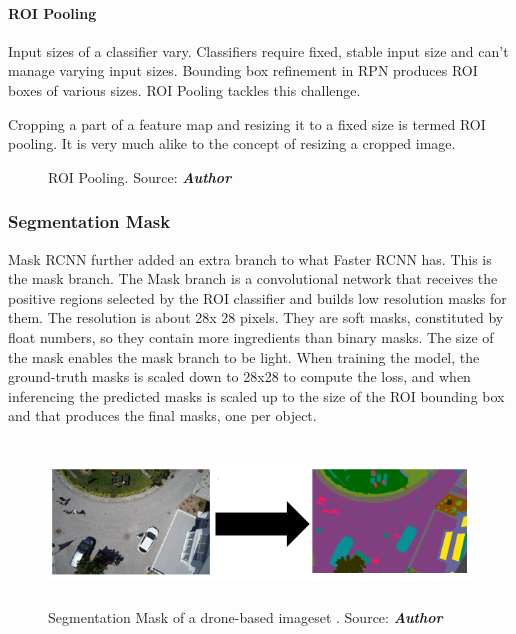 {\paragraph{ROI Pooling}

Input sizes of a classifier vary. Classifiers require fixed, stable input size and can’t manage varying input sizes. 
Bounding box refinement in RPN produces ROI boxes of various sizes. ROI Pooling tackles this challenge.

Cropping a part of a feature map and resizing it to a fixed size is termed ROI pooling. It is very much alike to the concept of resizing a cropped image.
 
\begin{figure}[H] 
\centering
   \caption{ROI Pooling. Source: \textbf{\textit{Author}}}
\end{figure}

\subsubsection{Segmentation Mask}
Mask RCNN further added an extra branch to what Faster RCNN has. This is the mask branch. The Mask branch is a convolutional network that receives the positive regions selected by the ROI classifier and builds low resolution masks for them. The resolution is about 28x 28 pixels. They are soft masks, constituted by float numbers, so they contain more ingredients than binary masks. The size of the mask enables the mask branch to be light. When training the model, the ground-truth masks is scaled down to 28x28 to compute the loss, and when inferencing the predicted masks is scaled up to the size of the ROI bounding box and that produces the final masks, one per object\cite{Y}.

\begin{figure}[H]
  \centering
    \includegraphics[height=1.7in]{images/mask.png}
     \caption{Segmentation Mask of a drone-based imageset . Source: \textbf{\textit{Author}} }
  \end{figure}

}
